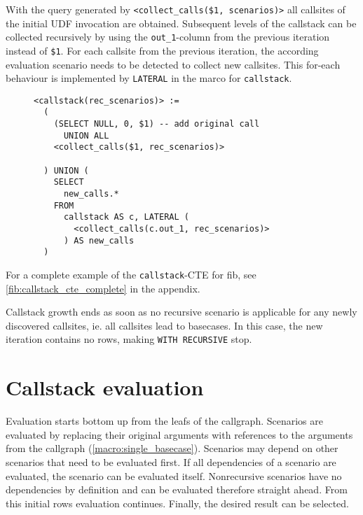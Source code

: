 With the query generated by \texttt{<collect\_calls(\$1, scenarios)>} all callsites of the initial UDF invocation are obtained. Subsequent levels of the callstack can be collected recursively by using the \texttt{out\_1}-column from the previous iteration instead of \texttt{\$1}. For each callsite from the previous iteration, the according evaluation scenario needs to be detected to collect new callsites. This for-each behaviour is implemented by \texttt{LATERAL} in the marco for \texttt{callstack}.

\begin{figure}[h!]\centering
\begin{verbatim}
<callstack(rec_scenarios)> :=
  (
    (SELECT NULL, 0, $1) -- add original call
      UNION ALL
    <collect_calls($1, rec_scenarios)> 

  ) UNION (
    SELECT
      new_calls.*
    FROM
      callstack AS c, LATERAL (
        <collect_calls(c.out_1, rec_scenarios)>
      ) AS new_calls
  )
\end{verbatim}
  \caption{}
  \label{}
\end{figure}

For a complete example of the \texttt{callstack}-CTE for fib, see \autoref{fib:callstack_cte_complete} in the appendix.

Callstack growth ends as soon as no recursive scenario is applicable for any newly discovered callsites, ie. all callsites lead to basecases. In this case, the new iteration contains no rows, making \texttt{WITH RECURSIVE} stop.

\section{Callstack evaluation}
Evaluation starts bottom up from the leafs of the callgraph. Scenarios are evaluated by replacing their original arguments with references to the arguments from the callgraph (\autoref{macro:single_basecase}). Scenarios may depend on other scenarios that need to be evaluated first. If all dependencies of a scenario are evaluated, the scenario can be evaluated itself. Nonrecursive scenarios have no dependencies by definition and can be evaluated therefore straight ahead. From this initial rows evaluation continues. Finally, the desired result can be selected.

